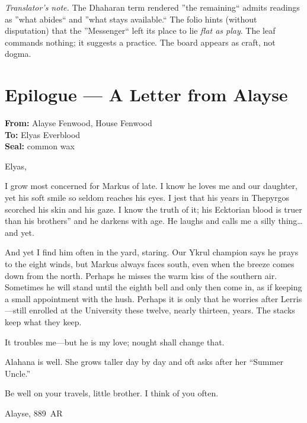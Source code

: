 \documentclass[11pt]{article}
\numberwithin{equation}{section} %
\theoremstyle{plain} %
\theoremstyle{definition} %
\theoremstyle{remark} %
\begin{document}
\medskip
\noindent\textit{Translator's note.} The Dhaharan term rendered ''the remaining`` admits readings as ''what abides`` and ''what stays available.`` The folio hints (without disputation) that the ''Messenger`` left its place to lie \emph{flat as play}. The leaf commands nothing; it suggests a practice. The board appears as craft, not dogma.

\section*{Epilogue --- A Letter from Alayse}

\noindent\textbf{From:} Alayse Fenwood, House Fenwood \\
\textbf{To:} Elyas Everblood \\
\textbf{Seal:} common wax

\medskip
\noindent Elyas,

I grow most concerned for Markus of late. I know he loves me and our daughter, yet his soft smile so seldom reaches his eyes. I jest that his years in Thepyrgos scorched his skin and his gaze. I know the truth of it; his Ecktorian blood is truer than his brothers'' and he darkens with age. He laughs and calls me a silly thing\ldots{} and yet.

And yet I find him often in the yard, staring. Our Ykrul champion says he prays to the eight winds, but Markus always faces south, even when the breeze comes down from the north. Perhaps he misses the warm kiss of the southern air. Sometimes he will stand until the eighth bell and only then come in, as if keeping a small appointment with the hush. Perhaps it is only that he worries after Lerris---still enrolled at the University these twelve, nearly thirteen, years. The stacks keep what they keep.

It troubles me---but he is my love; nought shall change that.

Alahana is well. She grows taller day by day and oft asks after her ``Summer Uncle.''

Be well on your travels, little brother. I think of you often.

\medskip
\noindent Alayse, 889~AR
\end{document}
